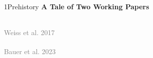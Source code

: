 \documentclass[xcolor=table,9pt,aspectratio=169]{beamer}
\begin{document}
\begin{frame}{\vspace*{10mm}1\hspace*{1em}Prehistory}
   \textbf{A Tale of Two Working Papers}
   \begin{multicols}{2}
      \begin{center}
         \\
         \textcolor{gray}{Weiss et al. 2017}\\
         \\
         \textcolor{gray}{Bauer et al. 2023}\\
      \end{center}
   \end{multicols}
\end{frame}
\end{document}
